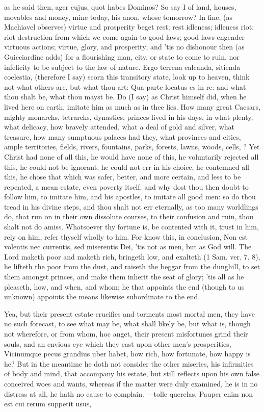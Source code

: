 {as he said then, ager cujus, quot habes Dominos? So say I of land,
houses, movables and money, mine today, his anon, whose tomorrow? In
fine, (as Machiavel observes) virtue and prosperity beget rest;
rest idleness; idleness riot; riot destruction from which we come again
to good laws; good laws engender virtuous actions; virtue, glory, and
prosperity; and 'tis no dishonour then (as Guicciardine adds) for a
flourishing man, city, or state to come to ruin, nor infelicity
to be subject to the law of nature. Ergo terrena calcanda, sitienda
coelestia, (therefore I say) scorn this transitory state, look up to
heaven, think not what others are, but what thou art: Qua parte
locatus es in re: and what thou shalt be, what thou mayst be. Do (I
say) as Christ himself did, when he lived here on earth, imitate him as
much as in thee lies. How many great Caesars, mighty monarchs,
tetrarchs, dynasties, princes lived in his days, in what plenty, what
delicacy, how bravely attended, what a deal of gold and silver, what
treasure, how many sumptuous palaces had they, what provinces and
cities, ample territories, fields, rivers, fountains, parks, forests,
lawns, woods, cells, \etc{}? Yet Christ had none of all this, he would
have none of this, he voluntarily rejected all this, he could not be
ignorant, he could not err in his choice, he contemned all this, he
chose that which was safer, better, and more certain, and less to be
repented, a mean estate, even poverty itself; and why dost thou then
doubt to follow him, to imitate him, and his apostles, to imitate all
good men: so do thou tread in his divine steps, and thou shalt not err
eternally, as too many worldlings do, that run on in their own
dissolute courses, to their confusion and ruin, thou shalt not do
amiss. Whatsoever thy fortune is, be contented with it, trust in him,
rely on him, refer thyself wholly to him. For know this, in conclusion,
Non est volentis nec currentis, sed miserentis Dei, 'tis not as men,
but as God will. The Lord maketh poor and maketh rich, bringeth low,
and exalteth (1 Sam.  ver. 7. 8), he lifteth the poor from the dust,
and raiseth the beggar from the dunghill, to set them amongst princes,
and make them inherit the seat of glory; 'tis all as he pleaseth, how,
and when, and whom; he that appoints the end (though to us unknown)
appoints the means likewise subordinate to the end.

Yea, but their present estate crucifies and torments most mortal men,
they have no such forecast, to see what may be, what shall likely be,
but what is, though not wherefore, or from whom, hoc anget, their
present misfortunes grind their souls, and an envious eye which they
cast upon other men's prosperities, Vicinumque pecus grandius uber
habet, how rich, how fortunate, how happy is he? But in the meantime he
doth not consider the other miseries, his infirmities of body and mind,
that accompany his estate, but still reflects upon his own false
conceived woes and wants, whereas if the matter were duly examined,
he is in no distress at all, he hath no cause to complain.
---tolle querelas,
Pauper enim non est cui rerum suppetit usus,

}
